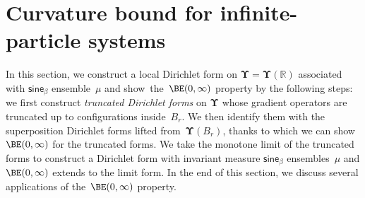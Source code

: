 \documentclass[11pt,letterpaper]{amsart}
\newcommand{\R}{{\mathbb R}}
\newcommand{\purple}[1]{{\color{purple}#1}}
\newcommand{\QP}{{\mu}}
\newcommand{\dUpsilon}{{\mathbf \Upsilon}}
\newcommand{\U}{\dUpsilon}
\newcommand{\sine}{\mathsf{sine}}
\newcommand{\E}{\mathcal E}
\renewcommand{\1}{\mathbf 1}
\numberwithin{equation}{section}
\theoremstyle{plain}
\theoremstyle{definition}
\theoremstyle{remark}
\renewcommand{\paragraph}[1]{\medskip\emph{#1}.\quad}
\begin{document}
\section{Curvature bound for infinite-particle systems} \label{sec:CI}
In this section, we construct a local Dirichlet form on $\U=\U(\R)$ associated with $\sine_\beta$ ensemble~$\QP$ and show~the~$\BE(0,\infty)$ property by the following steps: we first construct {\it truncated Dirichlet forms} on $\U$ whose gradient operators are truncated up to configurations inside~$B_r$. We then identify them with the superposition Dirichlet forms lifted from~$\U(B_r)$, thanks to which we can show~$\BE(0,\infty)$ for the truncated forms.   We take the monotone limit of the truncated forms to construct a Dirichlet form with invariant measure $\sine_\beta$ ensembles~$\QP$ and $\BE(0,\infty)$ extends to the limit form.
 In the end of this section, we discuss several applications of the~$\BE(0,\infty)$ property.
\end{document}
